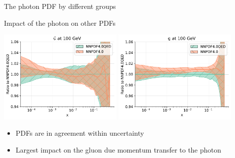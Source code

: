 \documentclass[aspectratio=169, 8pt,t]{beamer}
\begin{document}
\begin{frame}{The photon PDF by different groups}
\end{frame}


\begin{frame}{Impact of the photon on other PDFs}
  \begin{center}
    \includegraphics[width=0.45\textwidth]{figures/nnpdf40_vs_qed_ubar.pdf}
    \includegraphics[width=0.45\textwidth]{figures/nnpdf40_vs_qed_g.pdf}
  \end{center}
  \begin{itemize}
    \item PDFs are in agreement within uncertainty
    \item Largest impact on the gluon due momentum transfer to the photon
  \end{itemize}
\end{frame}
\end{document}
